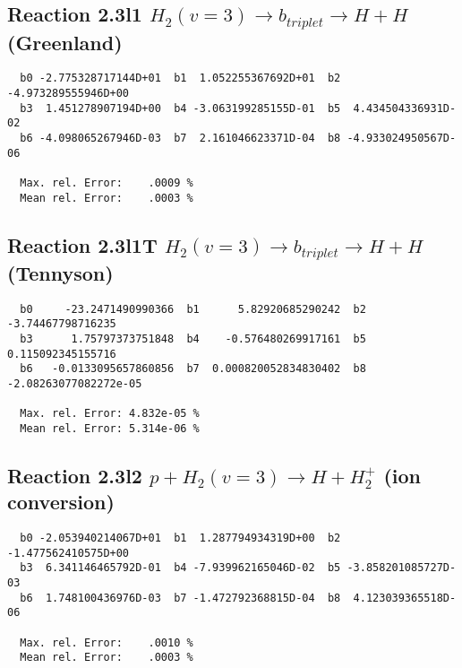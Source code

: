 \documentclass[12pt]{article}
\begin{document}
\newpage
\subsection{
Reaction 2.3l1
$ H_2(v=3) \rightarrow b_{triplet}\rightarrow H + H $ (Greenland) 
}


\begin{small}\begin{verbatim}
  b0 -2.775328717144D+01  b1  1.052255367692D+01  b2 -4.973289555946D+00
  b3  1.451278907194D+00  b4 -3.063199285155D-01  b5  4.434504336931D-02
  b6 -4.098065267946D-03  b7  2.161046623371D-04  b8 -4.933024950567D-06

  Max. rel. Error:    .0009 %
  Mean rel. Error:    .0003 %

\end{verbatim}\end{small}


\subsection{
Reaction 2.3l1T
$  H_2(v=3) \rightarrow b_{triplet}\rightarrow H + H $ (Tennyson)
}


\begin{small}\begin{verbatim}
  b0     -23.2471490990366  b1      5.82920685290242  b2     -3.74467798716235
  b3      1.75797373751848  b4    -0.576480269917161  b5     0.115092345155716
  b6   -0.0133095657860856  b7  0.000820052834830402  b8 -2.08263077082272e-05

  Max. rel. Error: 4.832e-05 %
  Mean rel. Error: 5.314e-06 %
\end{verbatim}\end{small}


\subsection{
Reaction 2.3l2
$ p + H_2(v=3) \rightarrow H + H_2^+$ (ion conversion)
}


\begin{small}\begin{verbatim}
  b0 -2.053940214067D+01  b1  1.287794934319D+00  b2 -1.477562410575D+00
  b3  6.341146465792D-01  b4 -7.939962165046D-02  b5 -3.858201085727D-03
  b6  1.748100436976D-03  b7 -1.472792368815D-04  b8  4.123039365518D-06

  Max. rel. Error:    .0010 %
  Mean rel. Error:    .0003 %

\end{verbatim}\end{small}
\end{document}
